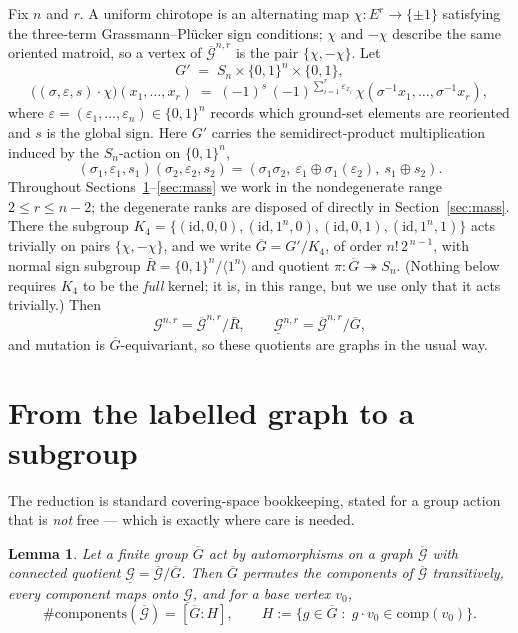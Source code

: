 \documentclass[11pt]{amsart}
\newtheorem{lemma}[theorem]{Lemma}
\theoremstyle{remark}
\newcommand{\Gb}{\overline{\mathcal{G}}}
\newcommand{\Gm}{\mathcal{G}}
\newcommand{\Gu}{\underline{\mathcal{G}}}
\newcommand{\Gbar}{\overline{G}}
\begin{document}
Fix $n$ and $r$. A uniform chirotope is an alternating map
$\chi\colon E^r\to\{\pm1\}$ satisfying the three-term Grassmann--Pl\"ucker
sign conditions; $\chi$ and $-\chi$ describe the same oriented matroid,
so a vertex of $\Gb^{n,r}$ is the pair $\{\chi,-\chi\}$. Let
\[
  G' \;=\; S_n\times\{0,1\}^n\times\{0,1\},
\]
\[
  \bigl((\sigma,\varepsilon,s)\cdot\chi\bigr)(x_1,\dots,x_r)
   \;=\;(-1)^{s}\,(-1)^{\sum_{i=1}^{r}\varepsilon_{x_i}}\,
        \chi(\sigma^{-1}x_1,\dots,\sigma^{-1}x_r),
\]
where $\varepsilon=(\varepsilon_1,\dots,\varepsilon_n)\in\{0,1\}^n$
records which ground-set elements are reoriented and $s$ is the global
sign. Here $G'$ carries the semidirect-product multiplication induced by
the $S_n$-action on $\{0,1\}^n$,
\[
  (\sigma_1,\varepsilon_1,s_1)(\sigma_2,\varepsilon_2,s_2)
  =(\sigma_1\sigma_2,\ \varepsilon_1\oplus\sigma_1(\varepsilon_2),\ s_1\oplus s_2).
\]
\sloppy
Throughout Sections~\ref{sec:reduction}--\ref{sec:mass} we work in the
nondegenerate range $2\le r\le n-2$; the degenerate ranks are disposed of
directly in Section~\ref{sec:mass}. There the subgroup
$K_4=\{(\mathrm{id},0,0),(\mathrm{id},1^n,0),(\mathrm{id},0,1),
(\mathrm{id},1^n,1)\}$ acts trivially on pairs $\{\chi,-\chi\}$, and we
write $\Gbar=G'/K_4$, of order $n!\,2^{\,n-1}$, with normal sign subgroup
$\bar R=\{0,1\}^n/\langle 1^n\rangle$ and quotient
$\pi\colon\Gbar\twoheadrightarrow S_n$. (Nothing below requires $K_4$ to
be the \emph{full} kernel; it is, in this range, but we use only that it
acts trivially.) Then
\[
  \Gm^{n,r}=\Gb^{n,r}/\bar R, \qquad \Gu^{n,r}=\Gb^{n,r}/\Gbar ,
\]
and mutation is $\Gbar$-equivariant, so these quotients are graphs in the
usual way.

\section{From the labelled graph to a subgroup}\label{sec:reduction}

The reduction is standard covering-space bookkeeping, stated for a group
action that is \emph{not} free --- which is exactly where care is needed.

\begin{lemma}\label{lem:transitive}
Let a finite group $\Gbar$ act by automorphisms on a graph $\Gb$ with
connected quotient $\Gu=\Gb/\Gbar$. Then $\Gbar$ permutes the components
of $\Gb$ transitively, every component maps onto $\Gu$, and for a base
vertex $v_0$,
\[
  \#\mathrm{components}(\Gb)=[\Gbar:H],\qquad
  H:=\{g\in\Gbar\;:\;g\cdot v_0\in\mathrm{comp}(v_0)\}.
\]
\end{lemma}
\end{document}

